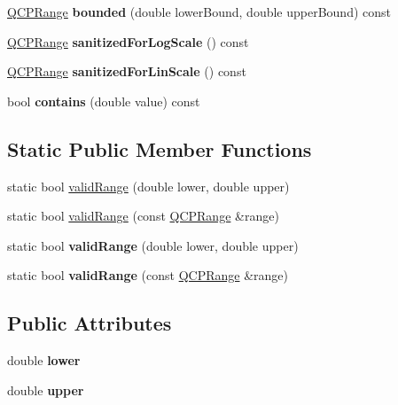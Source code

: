 \begin{DoxyCompactItemize}
\mbox{\label{class_q_c_p_range_a22151e18d961d762d25721211e89c2e5}} 
\hyperlink{class_q_c_p_range}{Q\+C\+P\+Range} {\bfseries bounded} (double lower\+Bound, double upper\+Bound) const
\item 
\mbox{\label{class_q_c_p_range_a3d66288d66e1d6df3636075eb42502ee}} 
\hyperlink{class_q_c_p_range}{Q\+C\+P\+Range} {\bfseries sanitized\+For\+Log\+Scale} () const
\item 
\mbox{\label{class_q_c_p_range_a808751fdd9b17ef52327ba011df2e5f1}} 
\hyperlink{class_q_c_p_range}{Q\+C\+P\+Range} {\bfseries sanitized\+For\+Lin\+Scale} () const
\item 
\mbox{\label{class_q_c_p_range_ae9842b48b6d38dc5e9607358e3083cc8}} 
bool {\bfseries contains} (double value) const
\end{DoxyCompactItemize}
\subsection*{Static Public Member Functions}
\begin{DoxyCompactItemize}
\item 
static bool \hyperlink{class_q_c_p_range_ab38bd4841c77c7bb86c9eea0f142dcc0}{valid\+Range} (double lower, double upper)
\item 
static bool \hyperlink{class_q_c_p_range_a801b964752eaad6219be9d8a651ec2b3}{valid\+Range} (const \hyperlink{class_q_c_p_range}{Q\+C\+P\+Range} \&range)
\item 
\mbox{\label{class_q_c_p_range_a50f6401a622e5bf55a9f5dc11778ec84}} 
static bool {\bfseries valid\+Range} (double lower, double upper)
\item 
\mbox{\label{class_q_c_p_range_a34be594ed3425caf7ad99e957f471186}} 
static bool {\bfseries valid\+Range} (const \hyperlink{class_q_c_p_range}{Q\+C\+P\+Range} \&range)
\end{DoxyCompactItemize}
\subsection*{Public Attributes}
\begin{DoxyCompactItemize}
\item 
\mbox{\label{class_q_c_p_range_aa3aca3edb14f7ca0c85d912647b91745}} 
double {\bfseries lower}
\item 
\mbox{\label{class_q_c_p_range_ae44eb3aafe1d0e2ed34b499b6d2e074f}} 
double {\bfseries upper}
\end{DoxyCompactItemize}
